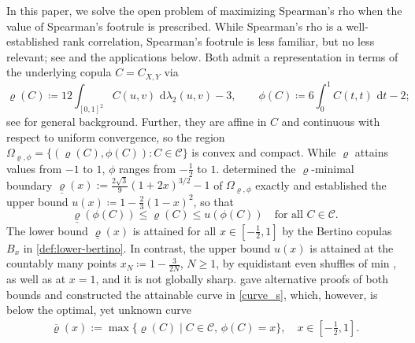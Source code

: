 \documentclass{article}
\newcommand{\CC}{\mathcal{C}}
\newcommand{\de}{\mathrm{\,d}}
\newcommand{\lam}{\lambda}
\begin{document}
In this paper, we solve the open problem of maximizing Spearman's rho when the value of Spearman's footrule is prescribed. While Spearman's rho is a well-established rank correlation, Spearman's footrule is less familiar, but no less relevant; see \cite{genest2010spearman} and the applications below. 
Both admit a representation in terms of the underlying copula \(C = C_{X,Y}\) via
\begin{equation}\label{eq:defs}
     \varrho(C)
    \coloneqq
    12\int_{[0,1]^2}C(u,v)\,\de\lam_2(u,v)-3,
    \qquad
    \phi(C)
    \coloneqq
    6\int_0^1 C(t,t)\,\de t-2;
\end{equation}
see \cite{durante2016principles,nelsen2006introduction} for general background.
Further, they are affine in $C$ and continuous with respect to uniform convergence, so the region $\Omega_{\varrho,\phi}=\{(\varrho(C),\phi(C)):C\in\CC\}$ is convex and compact.
While \(\varrho\) attains values from \(-1\) to \(1\), \(\phi\) ranges from \(-\tfrac 1 2\) to \(1\).
\citet{kokolbukovsek2024exact} determined the $\varrho$-minimal boundary \(\underline{\varrho}(x):= \tfrac{2\sqrt3}{9}(1+2x)^{3/2}-1\) of $\Omega_{\varrho,\phi}$ exactly and established the upper bound \(u(x) \coloneqq 1-\tfrac{2}{3}(1-x)^2\), so that
\begin{equation}\label{eq:ksbound}
	\underline{\varrho}(\phi(C)) \leq \varrho(C) \le u(\phi(C)) \quad \text{for all } C\in \CC.
\end{equation}
The lower bound \(\underline{\varrho}(x)\) is attained for all \(x\in[-\tfrac12,1]\) by the Bertino copulas \(B_x\) in \eqref{def:lower-bertino}.
In contrast, the upper bound \(u(x)\) is attained at the countably many points $x_N\coloneqq 1-\tfrac{3}{2N}$, $N\ge1$, by equidistant even shuffles of min \cite{mikusinski1992shuffles}, as well as at $x=1$, and it is not globally sharp.
\citet{tschimpke2025revisiting} gave alternative proofs of both bounds and constructed the attainable curve in \eqref{curve_s}, which, however, is below the optimal, yet unknown curve
\begin{align}\label{defmaxprob}
    \overline{\varrho}(x) := \max\{ \varrho(C) \mid C\in \CC,\, \phi(C) = x\}, \quad \text{} x\in [-\tfrac 1 2,1].
\end{align}
\end{document}
